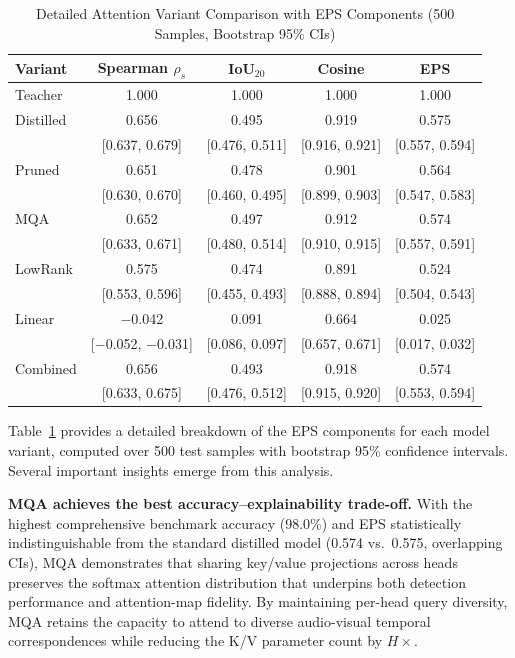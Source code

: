 \documentclass[lettersize,journal]{IEEEtran}
\begin{document}
\begin{table}[!t]
\caption{Detailed Attention Variant Comparison with EPS Components (500 Samples, Bootstrap 95\% CIs)\label{tab:attn_variants}}
\centering
\footnotesize
\begin{tabular}{lcccc}
\toprule
\textbf{Variant} & \textbf{Spearman $\rho_s$} & \textbf{IoU$_{20}$} & \textbf{Cosine} & \textbf{EPS} \\
\midrule
Teacher & 1.000 & 1.000 & 1.000 & 1.000 \\
\midrule
Distilled & 0.656 & 0.495 & 0.919 & 0.575 \\
 & {\scriptsize[0.637, 0.679]} & {\scriptsize[0.476, 0.511]} & {\scriptsize[0.916, 0.921]} & {\scriptsize[0.557, 0.594]} \\
Pruned & 0.651 & 0.478 & 0.901 & 0.564 \\
 & {\scriptsize[0.630, 0.670]} & {\scriptsize[0.460, 0.495]} & {\scriptsize[0.899, 0.903]} & {\scriptsize[0.547, 0.583]} \\
MQA & 0.652 & 0.497 & 0.912 & 0.574 \\
 & {\scriptsize[0.633, 0.671]} & {\scriptsize[0.480, 0.514]} & {\scriptsize[0.910, 0.915]} & {\scriptsize[0.557, 0.591]} \\
LowRank & 0.575 & 0.474 & 0.891 & 0.524 \\
 & {\scriptsize[0.553, 0.596]} & {\scriptsize[0.455, 0.493]} & {\scriptsize[0.888, 0.894]} & {\scriptsize[0.504, 0.543]} \\
Linear & $-$0.042 & 0.091 & 0.664 & 0.025 \\
 & {\scriptsize[$-$0.052, $-$0.031]} & {\scriptsize[0.086, 0.097]} & {\scriptsize[0.657, 0.671]} & {\scriptsize[0.017, 0.032]} \\
Combined & 0.656 & 0.493 & 0.918 & 0.574 \\
 & {\scriptsize[0.633, 0.675]} & {\scriptsize[0.476, 0.512]} & {\scriptsize[0.915, 0.920]} & {\scriptsize[0.553, 0.594]} \\
\bottomrule
\end{tabular}
\end{table}

Table~\ref{tab:attn_variants} provides a detailed breakdown of the EPS components for each model variant, computed over 500 test samples with bootstrap 95\% confidence intervals. Several important insights emerge from this analysis.

\textbf{MQA achieves the best accuracy--explainability trade-off.} With the highest comprehensive benchmark accuracy (98.0\%) and EPS statistically indistinguishable from the standard distilled model (0.574 vs.\ 0.575, overlapping CIs), MQA demonstrates that sharing key/value projections across heads preserves the softmax attention distribution that underpins both detection performance and attention-map fidelity. By maintaining per-head query diversity, MQA retains the capacity to attend to diverse audio-visual temporal correspondences while reducing the K/V parameter count by $H \times$.
\end{document}
